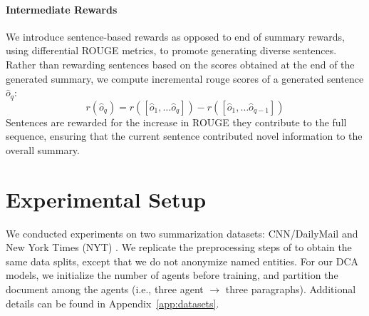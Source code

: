 \documentclass[11pt,a4paper]{article}
\begin{document}
\paragraph{Intermediate Rewards}
We introduce sentence-based rewards as opposed to end of summary rewards, using differential ROUGE metrics, to promote generating diverse sentences. Rather than rewarding sentences based on the scores obtained at the end of the generated summary, we compute incremental rouge scores of a generated sentence $\hat{o}_q$:
\vspace*{-5mm}
\begin{equation}
r(\hat{o}_q)=r([\hat{o}_{1},\dots \hat{o}_{q}])-r([\hat{o}_{1},\dots \hat{o}_{q-1}])
\end{equation}
Sentences are rewarded for the increase in ROUGE they contribute to the full sequence, ensuring that the current sentence contributed novel information to the overall summary.  \section{Experimental Setup}
\label{sec:experiments}
\label{ssec:datasets}
We conducted experiments on two summarization datasets: CNN/DailyMail \cite{summs2s,teachingmachines} and 
New York Times (NYT) \cite{nytdataset}. We replicate the preprocessing steps of \citet{rlsummsocher} to obtain the same data splits, except that we do not anonymize named entities. 
For our DCA models, we initialize the number of agents before training, 
and partition the document among the agents (i.e., three agent $\rightarrow$ three paragraphs). 
Additional details can be found in Appendix~\ref{app:datasets}.
\end{document}
